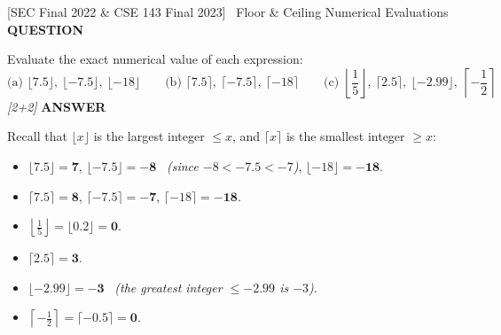 \documentclass[11pt,a4paper]{article}
\newcommand{\Qlabel}{\textbf{\color{navy}\footnotesize\MakeUppercase{Question}}\par\smallskip}
\newcommand{\Alabel}{\textbf{\color{teal}\footnotesize\MakeUppercase{Answer}}\par\smallskip}
\begin{document}
\begin{exambox}{[SEC Final 2022 \& CSE 143 Final 2023] \ Floor \& Ceiling Numerical Evaluations}
\Qlabel
Evaluate the exact numerical value of each expression:
\[
\text{(a) } \lfloor 7.5\rfloor, \ \lfloor -7.5\rfloor, \ \lfloor -18\rfloor \qquad
\text{(b) } \lceil 7.5\rceil, \ \lceil -7.5\rceil, \ \lceil -18\rceil \qquad
\text{(c) } \left\lfloor\frac{1}{5}\right\rfloor, \ \lceil 2.5\rceil, \ \lfloor -2.99\rfloor, \ \left\lceil-\frac{1}{2}\right\rceil
\]
\hfill\textit{[2+2]}
\tcblower
\Alabel
Recall that $\lfloor x \rfloor$ is the largest integer $\le x$, and $\lceil x \rceil$ is the smallest integer $\ge x$:
\begin{itemize}
    \item $\lfloor 7.5 \rfloor = \mathbf{7}$, \quad $\lfloor -7.5 \rfloor = \mathbf{-8}$ \ \textit{(since $-8 < -7.5 < -7$)}, \quad $\lfloor -18 \rfloor = \mathbf{-18}$.
    \item $\lceil 7.5 \rceil = \mathbf{8}$, \quad $\lceil -7.5 \rceil = \mathbf{-7}$, \quad $\lceil -18 \rceil = \mathbf{-18}$.
    \item $\left\lfloor\frac{1}{5}\right\rfloor = \lfloor 0.2 \rfloor = \mathbf{0}$.
    \item $\lceil 2.5 \rceil = \mathbf{3}$.
    \item $\lfloor -2.99 \rfloor = \mathbf{-3}$ \ \textit{(the greatest integer $\le -2.99$ is $-3$)}.
    \item $\left\lceil-\frac{1}{2}\right\rceil = \lceil -0.5 \rceil = \mathbf{0}$.
\end{itemize}
\end{exambox}
\end{document}
